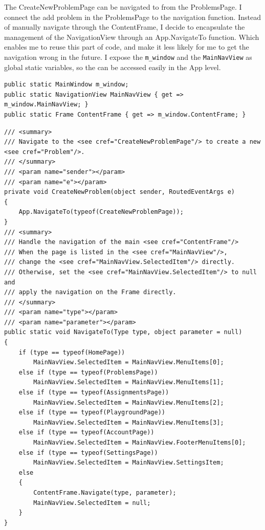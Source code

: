 \documentclass[a4paper]{report}
\newcommand{\code}{\texttt}
\begin{document}
The CreateNewProblemPage can be navigated to from the ProblemsPage. I connect the add problem in the ProblemsPage to the navigation function. Instead of manually navigate through the ContentFrame, I decide to encapsulate the management of the NavigationView through an App.NavigateTo function. Which enables me to reuse this part of code, and make it less likely for me to get the navigation wrong in the future. I expose the \code{m_window} and the \code{MainNavView} as global static variables, so the can be accessed easily in the App level.

\begin{verbatim}
public static MainWindow m_window;
public static NavigationView MainNavView { get => m_window.MainNavView; }
public static Frame ContentFrame { get => m_window.ContentFrame; }

\end{verbatim}

\begin{verbatim}
/// <summary>
/// Navigate to the <see cref="CreateNewProblemPage"/> to create a new <see cref="Problem"/>.
/// </summary>
/// <param name="sender"></param>
/// <param name="e"></param>
private void CreateNewProblem(object sender, RoutedEventArgs e)
{
    App.NavigateTo(typeof(CreateNewProblemPage));
}
/// <summary>
/// Handle the navigation of the main <see cref="ContentFrame"/>
/// When the page is listed in the <see cref="MainNavView"/>, 
/// change the <see cref="MainNavView.SelectedItem"/> directly.
/// Otherwise, set the <see cref="MainNavView.SelectedItem"/> to null and 
/// apply the navigation on the Frame directly.
/// </summary>
/// <param name="type"></param>
/// <param name="parameter"></param>
public static void NavigateTo(Type type, object parameter = null)
{
    if (type == typeof(HomePage))
        MainNavView.SelectedItem = MainNavView.MenuItems[0];
    else if (type == typeof(ProblemsPage))
        MainNavView.SelectedItem = MainNavView.MenuItems[1];
    else if (type == typeof(AssignmentsPage))
        MainNavView.SelectedItem = MainNavView.MenuItems[2];
    else if (type == typeof(PlaygroundPage))
        MainNavView.SelectedItem = MainNavView.MenuItems[3];
    else if (type == typeof(AccountPage))
        MainNavView.SelectedItem = MainNavView.FooterMenuItems[0];
    else if (type == typeof(SettingsPage))
        MainNavView.SelectedItem = MainNavView.SettingsItem;
    else
    {
        ContentFrame.Navigate(type, parameter);
        MainNavView.SelectedItem = null;
    }
}
\end{verbatim}
\end{document}
